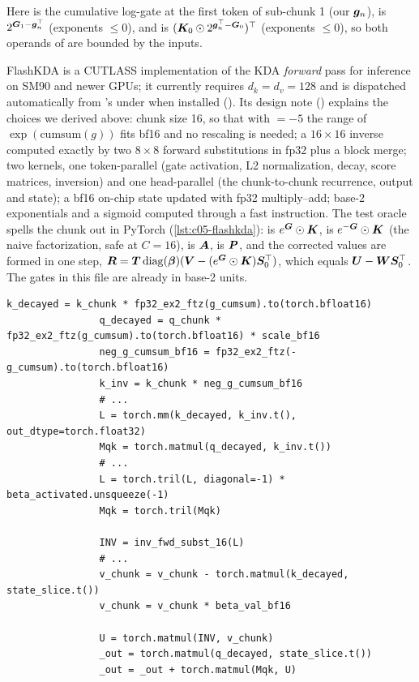 Here  is the cumulative log-gate at the first token of sub-chunk 1 (our $\bm{g}_n$),
 is $2^{\bm{G}_1 - \bm{g}_n^{\top}}$ (exponents $\le0$), and  is
$(\bm{K}_0\odot 2^{\bm{g}_n^{\top} - \bm{G}_0})^{\top}$ (exponents $\le0$), so both operands of  are
bounded by the inputs.

\begin{implnote}[title={In the code: FlashKDA (\texttt{MoonshotAI\_\_FlashKDA})}]
FlashKDA is a CUTLASS implementation of the KDA \emph{forward} pass for inference on SM90 and newer
GPUs; it currently requires $d_k = d_v = 128$ and is dispatched automatically from \fla{}'s
 under  when installed
(). Its design note
() explains the choices
we derived above: chunk size 16, so that with  $=-5$ the range of
$\exp(\mathrm{cumsum}(g))$ fits bf16 and no rescaling is needed; a $16\times16$ inverse computed
exactly by two $8\times8$ forward substitutions in fp32 plus a block merge; two kernels, one
token-parallel (gate activation, L2 normalization, decay, score matrices, inversion) and one
head-parallel (the chunk-to-chunk recurrence, output and state); a bf16 on-chip state updated with
fp32 multiply--add; base-2 exponentials and a sigmoid computed through a fast 
instruction. The test oracle  spells the
chunk out in PyTorch (\cref{lst:c05-flashkda}):  is $e^{\bm{G}}\odot\bm{K}$,
 is $e^{-\bm{G}}\odot\bm{K}$ (the naive factorization, safe at $C=16$),  is $\bm{A}$,
 is $\bm{P}$, and the corrected values are formed in one step,
$\bm R = \bm{T}\operatorname{diag}(\bm{\beta})(\bm{V} - (e^{\bm{G}}\odot\bm{K})\bm{S}_0^{\top})$, which equals $\bm{U} - \bm{W}\bm{S}_0^{\top}$. The
gates in this file are already in base-2 units.
\end{implnote}

\begin{lstlisting}[caption={Excerpt from \texttt{repos/\allowbreak{}MoonshotAI\_\_FlashKDA/\allowbreak{}tests/\allowbreak{}torch\_ref.py} (one chunk of 16 tokens, one head)},label={lst:c05-flashkda}]
                k_decayed = k_chunk * fp32_ex2_ftz(g_cumsum).to(torch.bfloat16)
                q_decayed = q_chunk * fp32_ex2_ftz(g_cumsum).to(torch.bfloat16) * scale_bf16
                neg_g_cumsum_bf16 = fp32_ex2_ftz(-g_cumsum).to(torch.bfloat16)
                k_inv = k_chunk * neg_g_cumsum_bf16
                # ...
                L = torch.mm(k_decayed, k_inv.t(), out_dtype=torch.float32)
                Mqk = torch.matmul(q_decayed, k_inv.t())
                # ...
                L = torch.tril(L, diagonal=-1) * beta_activated.unsqueeze(-1)
                Mqk = torch.tril(Mqk)

                INV = inv_fwd_subst_16(L)
                # ...
                v_chunk = v_chunk - torch.matmul(k_decayed, state_slice.t())
                v_chunk = v_chunk * beta_val_bf16

                U = torch.matmul(INV, v_chunk)
                _out = torch.matmul(q_decayed, state_slice.t())
                _out = _out + torch.matmul(Mqk, U)
\end{lstlisting}

